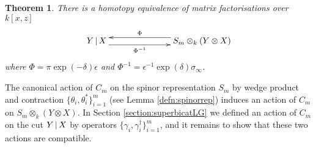 \documentclass[english,letter paper,12pt,leqno]{article}
\newtheorem{theorem}{Theorem}[section]
\theoremstyle{example}
\numberwithin{equation}{section}
\def\ferm{\gamma}
\def\fermc{\gamma^\dagger}
\begin{document}
\begin{theorem}\label{theorem:htpy_equivalence_main} There is a homotopy equivalence of matrix factorisations over $k[x,z]$
\begin{equation}\label{eq:final_finite_model}
\xymatrix@C+4pc{
Y \l X \ar@<-1ex>[r]_-{\Phi^{-1}} & S_m \otimes_k ( Y \otimes X )\ar@<-1ex>[l]_-{\Phi}
}
\end{equation}
where $\Phi = \pi \exp(-\delta) \epsilon$ and $\Phi^{-1} = \epsilon^{-1} \exp(\delta) \sigma_\infty$.
\end{theorem}

The canonical action of $C_m$ on the spinor representation $S_m$ by wedge product and contraction $\{ \theta_i, \theta_i^* \}_{i=1}^m$ (see Lemma \ref{defn:spinorrep}) induces an action  of $C_m$ on $S_m \otimes_k ( Y \otimes X )$. In Section \ref{section:superbicatLG} we defined an action of $C_m$ on the cut $Y \,|\, X$ by operators $\{ \ferm_i, \fermc_i \}_{i=1}^m$, and it remains to show that these two actions are compatible.
\end{document}
